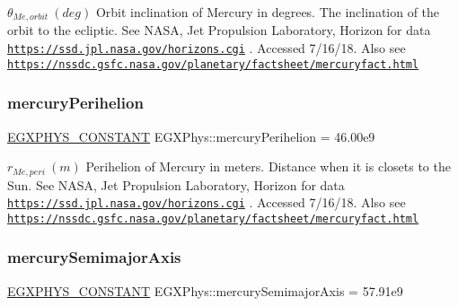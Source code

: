 $ \theta_{Me,orbit} \ (deg)$ Orbit inclination of Mercury in degrees. The inclination of the orbit to the ecliptic. See N\+A\+SA, Jet Propulsion Laboratory, Horizon for data \href{https://ssd.jpl.nasa.gov/horizons.cgi}{\tt https\+://ssd.\+jpl.\+nasa.\+gov/horizons.\+cgi} . Accessed 7/16/18. Also see \href{https://nssdc.gsfc.nasa.gov/planetary/factsheet/mercuryfact.html}{\tt https\+://nssdc.\+gsfc.\+nasa.\+gov/planetary/factsheet/mercuryfact.\+html} \mbox{\label{group___e_g_x_phys-_constants-_astrophysics-_solar_system-_mercury-_orbit_ga6aff57e13acffaffc3cfe97694da2363}} 
\subsubsection{\texorpdfstring{mercury\+Perihelion}{mercuryPerihelion}}
{\footnotesize\ttfamily \mbox{\hyperlink{group___e_g_x_phys-_constants-_macros_ga76980d288494ce1714c9ac68a95ba702}{E\+G\+X\+P\+H\+Y\+S\+\_\+\+C\+O\+N\+S\+T\+A\+NT}} E\+G\+X\+Phys\+::mercury\+Perihelion = 46.\+00e9}

$ r_{Me,peri} \ (m)$ Perihelion of Mercury in meters. Distance when it is closets to the Sun. See N\+A\+SA, Jet Propulsion Laboratory, Horizon for data \href{https://ssd.jpl.nasa.gov/horizons.cgi}{\tt https\+://ssd.\+jpl.\+nasa.\+gov/horizons.\+cgi} . Accessed 7/16/18. Also see \href{https://nssdc.gsfc.nasa.gov/planetary/factsheet/mercuryfact.html}{\tt https\+://nssdc.\+gsfc.\+nasa.\+gov/planetary/factsheet/mercuryfact.\+html} \mbox{\label{group___e_g_x_phys-_constants-_astrophysics-_solar_system-_mercury-_orbit_ga595bacd615f9a5a0d92f53f6e7e01f04}} 
\subsubsection{\texorpdfstring{mercury\+Semimajor\+Axis}{mercurySemimajorAxis}}
{\footnotesize\ttfamily \mbox{\hyperlink{group___e_g_x_phys-_constants-_macros_ga76980d288494ce1714c9ac68a95ba702}{E\+G\+X\+P\+H\+Y\+S\+\_\+\+C\+O\+N\+S\+T\+A\+NT}} E\+G\+X\+Phys\+::mercury\+Semimajor\+Axis = 57.\+91e9}

